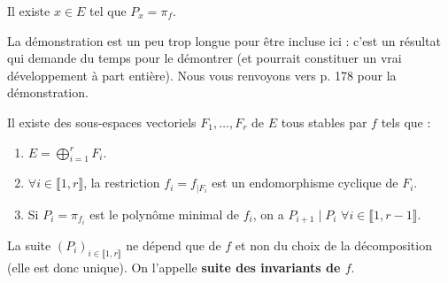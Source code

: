 
  \begin{lemma}
    \label{invariants-de-similitude-2}
    Il existe $x \in E$ tel que $P_x = \pi_f$.
  \end{lemma}

  \begin{remark}
    La démonstration est un peu trop longue pour être incluse ici : c'est un résultat qui demande du temps pour le démontrer (et pourrait constituer un vrai développement à part entière). Nous vous renvoyons vers \cite{[GOU21]} p. 178 pour la démonstration.
  \end{remark}

  \begin{theorem}[Frobenius]
    Il existe des sous-espaces vectoriels $F_1, \dots, F_r$ de $E$ tous stables par $f$ tels que :
    \begin{enumerate}[label=(\roman*)]
      \item \label{invariants-de-similitude-3} $E = \bigoplus_{i = 1}^r F_i$.
      \item \label{invariants-de-similitude-4} $\forall i \in \llbracket 1, r \rrbracket$, la restriction $f_i = f_{|F_i}$ est un endomorphisme cyclique de $F_i$.
      \item \label{invariants-de-similitude-5} Si $P_i = \pi_{f_i}$ est le polynôme minimal de $f_i$, on a $P_{i+1} \mid P_i$ $\forall i \in \llbracket 1, r-1 \rrbracket$.
    \end{enumerate}
    La suite $(P_i)_{i \in \llbracket 1, r \rrbracket}$ ne dépend que de $f$ et non du choix de la décomposition (elle est donc unique). On l'appelle \textbf{suite des invariants de $f$}.
  \end{theorem}

